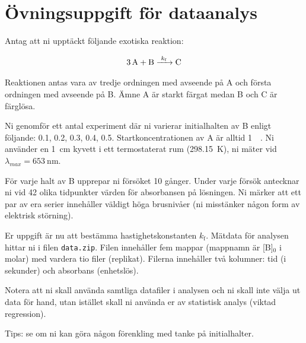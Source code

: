 \section{Övningsuppgift för dataanalys}
\label{sec:exercise}
Antag att ni upptäckt följande exotiska reaktion:

\begin{align}
  \label{eq:fourth-order}
  \ce{3A + B ->[k_\mathrm{f}] C}
\end{align}

Reaktionen antas vara av tredje ordningen med avseende på A och första
ordningen med avseende på B. Ämne A är starkt färgat medan B och C är
färglösa.

Ni genomför ett antal experiment där ni varierar initialhalten av B enligt
följande: \SI{0.1}{\Molar}, \SI{0.2}{\Molar}, \SI{0.3}{\Molar}, \SI{0.4}{\Molar},
\SI{0.5}{\Molar}. Startkoncentrationen av A är alltid
\SI{1}{\milli\Molar}. Ni använder en \SI{1}{\cm} kyvett i ett
termostaterat rum (\SI{298.15}{\kelvin}), ni mäter vid
$\lambda_{max}=\SI{653}{\nano\metre}$.

För varje halt av B upprepar ni försöket 10 gånger. Under varje försök
antecknar ni vid 42 olika tidpunkter värden för absorbansen på lösningen.
Ni märker att ett par av era serier innehåller väldigt höga brusnivåer
(ni misstänker någon form av elektrisk störning).

Er uppgift är nu att bestämma hastighetskonstanten $k_\mathrm{f}$. Mätdata för
analysen hittar ni i filen {\tt data.zip}. Filen innehåller fem mappar
(mappnamn är [B]$_0$ i molar) med vardera tio filer (replikat). Filerna
innehåller två kolumner: tid (i sekunder) och absorbans (enhetslös).

Notera att ni skall använda samtliga datafiler i analysen och ni skall
inte välja ut data för hand, utan istället skall ni använda er av
statistisk analys (viktad regression).

Tips: se om ni kan göra någon förenkling med tanke på initialhalter.

